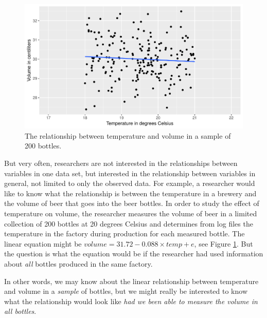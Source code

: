 \documentclass[]{report}\usepackage[]{graphicx}\usepackage[]{color}
\makeatletter
\def\maxwidth{ %
  \ifdim\Gin@nat@width>\linewidth
    \linewidth
  \else
    \Gin@nat@width
  \fi
}
\newenvironment{knitrout}{}{} %
\makeatother
\begin{document}
\begin{knitrout}
\color{fgcolor}\begin{figure}

{\centering \includegraphics[width=\maxwidth]{figure/inf_0-1} 

}

\caption[The relationship between temperature and volume in a sample of 200 bottles]{The relationship between temperature and volume in a sample of 200 bottles.}\label{fig:inf_0}
\end{figure}


\end{knitrout}


But very often, researchers are not interested in the relationships between variables in one data set, but interested in the relationship between variables in general, not limited to only the observed data. For example, a researcher would like to know what the relationship is between the temperature in a brewery and the volume of beer that goes into the beer bottles. In order to study the effect of temperature on volume, the researcher measures the volume of beer in a limited collection of 200 bottles at 20 degrees Celsius and determines from log files the temperature in the factory during production for each measured bottle. The linear equation might be $volume = 31.72 -0.088 \times temp + e$, see Figure \ref{fig:inf_0}. But the question is what the equation would be if the researcher had used information about \textit{all} bottles produced in the same factory.



In other words, we may know about the linear relationship between temperature and volume in a \textit{sample} of bottles, but we might really be interested to know what the relationship would look like \textit{had we been able to measure the volume in all bottles}.
\end{document}
